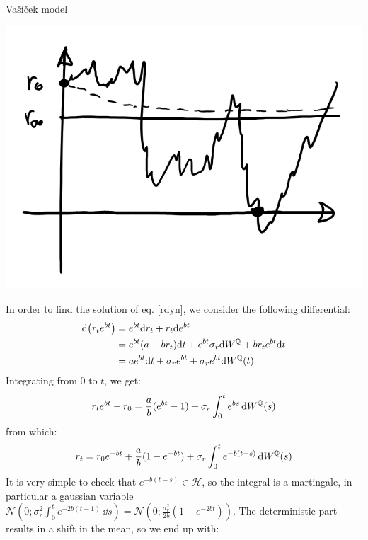 \begin{example}{Vašíček model}{}{}
    \begin{center}\label{fig:vasicek}
        \includegraphics[scale=0.3]{fig/tmp/fig30.png}
    \end{center}
    In order to find the solution of eq. \eqref{rdyn}, we consider the following differential:
    \begin{align}
        \notag \dd(r_te^{bt}) &= e^{bt}\dd r_t + r_t\dd e^{bt} \\
        &=
        \notag e^{bt}(a-br_t)\dd t + e^{bt}\sigma_r \dd W^{\mathbb{Q}} + br_te^{bt}\dd t \\
        &=
        ae^{bt}\dd t + \sigma_r e^{bt} + \sigma_r e^{bt} \dd W^{\mathbb{Q}}(t)
    \end{align}
    Integrating from 0 to $t$, we get:
    \begin{align}
        r_t e^{bt} - r_0 = \frac{a}{b}(e^{bt}-1) + \sigma_r \int_0^t e^{bs}\,\dd W^{\mathbb{Q}}(s)
    \end{align}
    from which:
    \begin{equation}
        r_t = r_0e^{-bt} + \frac{a}{b}(1-e^{-bt}) + \sigma_r \int_0^t e^{-b(t-s)}\,\dd W^{\mathbb{Q}}(s)
    \end{equation}
    It is very simple to check that $e^{-b(t-s)}\in\mathcal{H}$, so the integral is a martingale, in particular a gaussian variable $\mathcal{N}\left(0;\sigma_r^2\int_0^te^{-2b(t-1)}\,\dd s\right) = \mathcal{N}\left(0;\frac{\sigma^2_r}{2b}\left(1-e^{-2bt}\right)\right)$. The deterministic part results in a shift in the mean, so we end up with:

\end{example}
